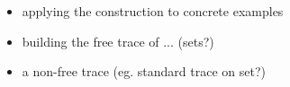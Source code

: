 \begin{itemize}
	\item applying the construction to concrete examples
	\item building the free trace of ... (sets?)
	\item a non-free trace (eg. standard trace on set?)
\end{itemize}

